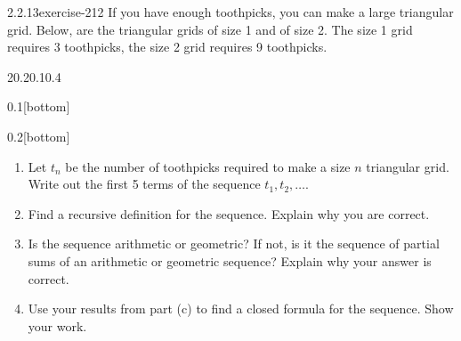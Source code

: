 \documentclass[twoside,11pt,]{book}
\numberwithin{equation}{chapter}
\begin{document}
\begin{divisionsolution}{2.2.13}{}{exercise-212}%
\hypertarget{p-3265}{}%
If you have enough toothpicks, you can make a large triangular grid. Below, are the triangular grids of size 1 and of size 2. The size 1 grid requires 3 toothpicks, the size 2 grid requires 9 toothpicks.%
\begin{sidebyside}{2}{0.2}{0.1}{0.4}%
\begin{sbspanel}{0.1}[bottom]%
\end{sbspanel}%
\begin{sbspanel}{0.2}[bottom]%
\end{sbspanel}%
\end{sidebyside}%
\par
\hypertarget{p-3266}{}%
\leavevmode%
\begin{enumerate}[label=(\alph*)]
\item\hypertarget{li-1906}{}\hypertarget{p-3267}{}%
Let \(t_n\) be the number of toothpicks required to make a size \(n\) triangular grid. Write out the first 5 terms of the sequence \(t_1, t_2, \ldots\). %
\item\hypertarget{li-1907}{}\hypertarget{p-3268}{}%
Find a recursive definition for the sequence. Explain why you are correct. %
\item\hypertarget{li-1908}{}\hypertarget{p-3269}{}%
Is the sequence arithmetic or geometric? If not, is it the sequence of partial sums of an arithmetic or geometric sequence? Explain why your answer is correct. %
\item\hypertarget{li-1909}{}\hypertarget{p-3270}{}%
Use your results from part (c) to find a closed formula for the sequence. Show your work. %
\end{enumerate}
%
\end{divisionsolution}%
\end{document}
